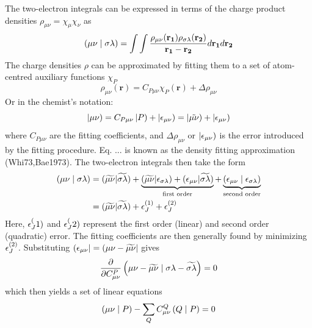 The two-electron integrals can be expressed in terms of the charge product densities $\rho_{\mu\nu} = \chi_{\mu} \chi_{\nu}$ as
\begin{equation}
\left( \mu\nu \mid \sigma\lambda \right) = \int \int \frac{\rho_{\mu\nu}(\mathbf{r_1}) \rho_{\sigma\lambda}(\mathbf{r_2}) }{\mathbf{r_1} - \mathbf{r_2}} d\mathbf{r_1} d\mathbf{r_2}
\end{equation}
The charge densities $\rho$ can be approximated by fitting them to a set of atom-centred auxiliary functions $\chi_P$
\begin{equation}
\rho_{\mu\nu}(\mathbf{r}) = C_{P\mu\nu} \chi_{P}(\mathbf{r}) + \Delta \rho_{\mu\nu}
\end{equation}
\noindent Or in the chemist's notation:
\begin{equation}
\left\lvert \mu\nu \right) = C_{P\mu\nu} \left\lvert P \right) + \left\lvert \epsilon_{\mu\nu} \right) = \left\lvert \tilde{\mu\nu} \right) + \left\lvert \epsilon_{\mu\nu} \right)
\end{equation}
\noindent where $C_{P\mu\nu}$ are the fitting coefficients, and $\Delta \rho_{\mu\nu}$ or $\left\lvert \epsilon_{\mu\nu} \right)$ is the error introduced by the fitting procedure. Eq. ... is known as the density fitting approximation (Whi73,Bae1973). The two-electron integrals then take the form
\begin{equation}
\begin{split}
\left( \mu\nu \mid \sigma\lambda \right) &= (\widetilde{\mu\nu}|\widetilde{\sigma\lambda}) +  \underbrace{(\widetilde{\mu\nu}|\epsilon_{\sigma\lambda}) + (\epsilon_{\mu\nu}|\widetilde{\sigma\lambda})}_\textrm{first order} + \underbrace{\left( \epsilon_{\mu\nu} \mid \epsilon_{\sigma\lambda} \right)}_\textrm{second order} \\
&= (\widetilde{\mu\nu}|\widetilde{\sigma\lambda}) + \epsilon_J^{(1)} + \epsilon_J^{(2)} 
\end{split}
\end{equation}
\noindent Here, $\epsilon_J^({1})$ and $\epsilon_J^({2})$ represent the first order (linear) and second order (quadratic) error. The fitting coefficients are then generally found by minimizing $\epsilon_J^{(2)}$. Substituting $\left( \epsilon_{\mu\nu} \right\rvert = \left( \mu\nu - \widetilde{\mu\nu} \right\rvert$ gives
\begin{equation}
\frac{\partial}{\partial C^P_{\mu\nu}} \left( \mu\nu - \widetilde{\mu\nu} \mid \sigma\lambda - \widetilde{\sigma\lambda} \right) = 0
\end{equation}
\noindent which then yields a set of linear equations
\begin{equation}
\left( \mu\nu \mid P \right) - \sum_Q C^Q_{\mu\nu} \left( Q \mid P \right) = 0 
\end{equation}
